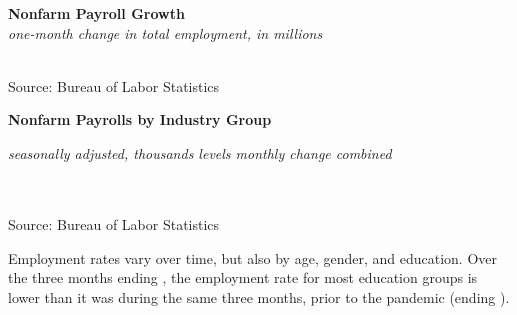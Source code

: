 \documentclass{report}
\newcommand{\tbllink}[1]{\href{https://raw.githubusercontent.com/bdecon/US-chartbook/master/chartbook/data/#1}{\faTable}}
\newcommand{\ctsbar}[5]{
		\addplot[ybar stacked, bar width=#5, draw opacity=0, fill=#1] 
			table [x=#2, y=#3, col sep=comma]{#4};}
\newcommand{\dateaxisticks}{
		date coordinates in=x, axis line style={draw=none},
		xmax={2021-06-15},
		max space between ticks=40,	    
		xtick={{1990-01-01}, {1992-01-01}, {1994-01-01}, 
			{1996-01-01}, {1998-01-01}, {2000-01-01}, 
			{2002-01-01}, {2004-01-01}, {2006-01-01},
			{2008-01-01}, {2010-01-01}, {2012-01-01}, {2014-01-01},
		    {2016-01-01}, {2018-01-01}, {2020-01-01}},
		minor xtick={{1989-01-01}, {1991-01-01}, {1993-01-01},
			{1995-01-01}, {1997-01-01}, {1999-01-01}, 
			{2001-01-01}, {2003-01-01}, {2005-01-01}, {2007-01-01},
		    {2009-01-01}, {2011-01-01}, {2013-01-01}, {2015-01-01},
		    {2017-01-01}, {2019-01-01}, {2021-01-01}},
		enlarge y limits={0.06}, enlarge x limits={0.01},
		}
\newcommand{\bbar}[2]{extra #1 ticks = {{#2}}, extra #1 tick labels = ,
		extra #1 tick style = {grid=major, grid style={thick, black!25}},}
\begin{document}
{\begin{minipage}{0.28\textwidth}

\end{minipage} \hspace{6mm}
\begin{minipage}{0.43\textwidth}
\normalsize \textbf{Nonfarm Payroll Growth}\\
\footnotesize{\textit{one-month change in total employment, in millions}}\\
\hspace*{-3mm} \\
\footnotesize{Source: Bureau of Labor Statistics} \hfill \tbllink{nfp.csv}
\end{minipage}
\vspace{3mm}

\normalsize \textbf{Nonfarm Payrolls by Industry Group}\\
\footnotesize{\textit{seasonally adjusted, thousands \hspace{9mm}levels \hspace{17mm} monthly change \hspace{29mm} combined}\\
\vspace{-5mm}

\hspace*{-3mm} \noindent {} \setlength{\tabcolsep}{3.1pt} \color{black!90}
		{\renewcommand{\arraystretch}{1.55}
		 \begin{tabular}{p{38mm} R{12mm} R{12mm} | R{9.5mm} R{9.5mm} R{9.5mm} 
		   R{10mm} | R{11mm} R{11mm}}
			  \hline
		\end{tabular}
		}	\\
		
\vspace{-2mm}
\footnotesize{Source: Bureau of Labor Statistics} \hspace{9.7cm} \tbllink{ces_data.csv}

\newpage
\begin{minipage}{0.76\textwidth} 
\small Employment rates vary over time, but also by age, gender, and education. Over the three months ending \unskip, the employment rate for most education groups is lower than it was during the same three months, prior to the pandemic (ending \unskip).
\vspace{2mm}


\end{minipage}}}
\end{document}
